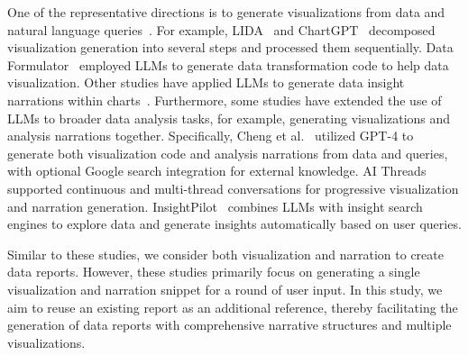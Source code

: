 One of the representative directions is to generate visualizations from data and natural language queries~\cite{maddigan2023chat2vis}.
For example, LIDA~\cite{dibia2023lida} and ChartGPT~\cite{tian2024chartgpt} decomposed visualization generation into several steps and processed them sequentially.
Data Formulator~\cite{wang2023dataFormulator} employed LLMs to generate data transformation code to help data visualization. 
Other studies have applied LLMs to generate data insight narrations within charts~\cite{ying2023livecharts}. 
Furthermore, some studies have extended the use of LLMs to broader data analysis tasks, for example, generating visualizations and analysis narrations together. 
Specifically, Cheng et al.~\cite{cheng2023gpt4analyst} utilized GPT-4 to generate both visualization code and analysis narrations from data and queries, with optional Google search integration for external knowledge. 
AI Threads~\cite{hong2023aithreads} supported continuous and multi-thread conversations for progressive visualization and narration generation. 
InsightPilot~\cite{ma2023insightpilot} combines LLMs with insight search engines to explore data and generate insights automatically based on user queries. 

Similar to these studies, we consider both visualization and narration to create data reports. 
However, these studies primarily focus on generating a single visualization and narration snippet for a round of user input. 
In this study, we aim to reuse an existing report as an additional reference, thereby facilitating the generation of data reports with comprehensive narrative structures and multiple visualizations.